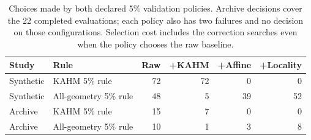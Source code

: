 \begin{table}[!htbp]
\centering\small\setlength{\tabcolsep}{4pt}
\caption{Choices made by both declared 5\% validation policies. Archive decisions cover the 22 completed evaluations; each policy also has two failures and no decision on those configurations. Selection cost includes the correction searches even when the policy chooses the raw baseline.}
\label{tab:utility-policy-choices}
\begin{tabular}{llrrrr}
\toprule
Study & Rule & Raw & +KAHM & +Affine & +Locality \\
\midrule
Synthetic & KAHM 5\% rule & 72 & 72 & 0 & 0 \\
Synthetic & All-geometry 5\% rule & 48 & 5 & 39 & 52 \\
Archive & KAHM 5\% rule & 15 & 7 & 0 & 0 \\
Archive & All-geometry 5\% rule & 10 & 1 & 3 & 8 \\
\bottomrule
\end{tabular}
\end{table}
